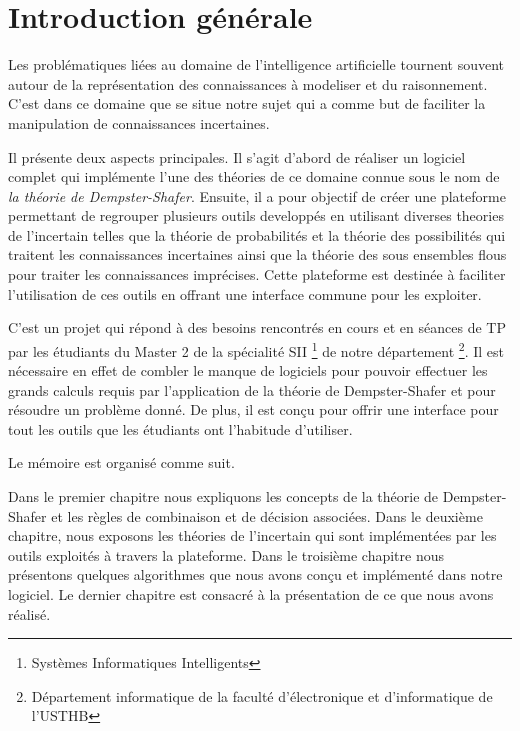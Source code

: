 {}
\chapter*{Introduction générale}
Les problématiques liées au domaine de l'intelligence artificielle tournent souvent autour de la représentation
des connaissances à modeliser et du raisonnement. C'est dans ce domaine que se situe notre sujet qui a comme but
de faciliter la manipulation de connaissances incertaines.

Il présente deux aspects principales. Il s'agit d'abord de réaliser un logiciel complet qui implémente l'une des
théories de ce domaine connue sous le nom de \emph{la théorie de Dempster-Shafer}. Ensuite, il a pour objectif de
créer une plateforme permettant de regrouper plusieurs outils developpés en utilisant diverses theories de l'incertain
telles que la théorie de probabilités et la théorie des possibilités qui traitent les connaissances incertaines ainsi
que la théorie des sous ensembles flous pour traiter les connaissances imprécises. Cette plateforme est destinée à
faciliter l'utilisation de ces outils en offrant une interface commune pour les exploiter.

C'est un projet qui répond à des besoins rencontrés en cours et en séances de TP par les étudiants du Master 2 de la
spécialité SII \footnote{Systèmes Informatiques Intelligents} de notre département \footnote{Département informatique
de la faculté d'électronique et d'informatique de l'USTHB}. Il est nécessaire en effet de combler le manque de logiciels
pour pouvoir effectuer les grands calculs requis par l'application de la théorie de Dempster-Shafer et pour résoudre un
problème donné. De plus, il est conçu pour offrir une interface pour tout les outils que les étudiants ont l'habitude
d'utiliser.

Le mémoire est organisé comme suit.

Dans le premier chapitre nous expliquons les concepts de la théorie de Dempster-Shafer et les règles de combinaison
et de décision associées. Dans le deuxième chapitre, nous exposons les théories de l'incertain qui sont implémentées
par les outils exploités à travers la plateforme. Dans le troisième chapitre nous présentons quelques algorithmes que
nous avons conçu et implémenté dans notre logiciel. Le dernier chapitre est consacré à la présentation de ce que
nous avons réalisé.